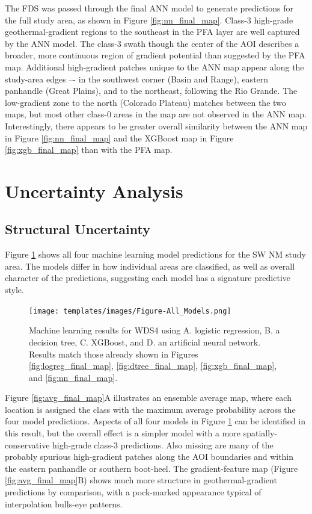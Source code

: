 The FDS was passed through the final ANN model to generate predictions for the full study area, as shown in Figure \ref{fig:nn_final_map}. Class-3 high-grade geothermal-gradient regions to the southeast in the \citet{bielicki_hydrogeolgic_2015} PFA layer are well captured by the ANN model. The class-3 swath though the center of the AOI describes a broader, more continuous region of gradient potential than suggested by the PFA map. Additional high-gradient patches unique to the ANN map appear along the study-area edges –- in the southwest corner (Basin and Range), eastern panhandle (Great Plains), and to the northeast, following the Rio Grande. The low-gradient zone to the north (Colorado Plateau) matches between the two maps, but most other class-0 areas in the \citeauthor{bielicki_hydrogeolgic_2015} map are not observed in the ANN map. Interestingly, there appears to be greater overall similarity between the ANN map in Figure \ref{fig:nn_final_map} and the XGBoost map in Figure \ref{fig:xgb_final_map} than with the PFA map.

\section{Uncertainty Analysis}\label{ch5:uncertainty_analysis}

\subsection{Structural Uncertainty}\label{ch5:structural_uncertainty}

Figure \ref{fig:combined_maps} shows all four machine learning model predictions for the SW NM study area. The models differ in how individual areas are classified, as well as overall character of the predictions, suggesting each model has a signature predictive style.

\begin{figure}[!htp]
\centering
\texttt{[image: templates/images/Figure-All\_Models.png]}
\caption[Combined machine learning results]{Machine learning results for WDS4 using A. logistic regression, B. a decision tree, C. XGBoost, and D. an artificial neural network. Results match those already shown in Figures \ref{fig:logreg_final_map}, \ref{fig:dtree_final_map}, \ref{fig:xgb_final_map}, and \ref{fig:nn_final_map}.}
\label{fig:combined_maps}
\end{figure}

Figure \ref{fig:avg_final_map}A illustrates an ensemble average map, where each location is assigned the class with the maximum average probability across the four model predictions. Aspects of all four models in Figure \ref{fig:combined_maps} can be identified in this result, but the overall effect is a simpler model with a more spatially-conservative high-grade class-3 predictions. Also missing are many of the probably spurious high-gradient patches along the AOI boundaries and within the eastern panhandle or southern boot-heel. The \citeauthor{bielicki_hydrogeolgic_2015} gradient-feature map (Figure \ref{fig:avg_final_map}B) shows much more structure in geothermal-gradient predictions by comparison, with a pock-marked appearance typical of interpolation bulls-eye patterns.

